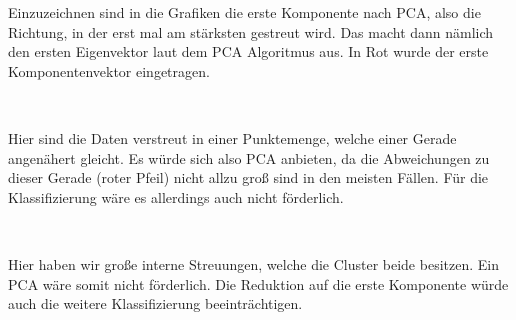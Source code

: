 \begin{aufgabe}
\end{aufgabe}

Einzuzeichnen sind in die Grafiken die erste Komponente nach PCA, also die Richtung, in der erst mal am stärksten gestreut wird. Das macht dann nämlich den ersten Eigenvektor laut dem PCA Algoritmus aus. In Rot wurde der erste Komponentenvektor eingetragen.

\begin{center}
	\\
\end{center}
Hier sind die Daten verstreut in einer Punktemenge, welche einer Gerade angenähert gleicht. Es würde sich also PCA anbieten, da die Abweichungen zu dieser Gerade (roter Pfeil) nicht allzu groß sind in den meisten Fällen. Für die Klassifizierung wäre es allerdings auch nicht förderlich.
\begin{center}
	\\
\end{center}
Hier haben wir große interne Streuungen, welche die Cluster beide besitzen. Ein PCA wäre somit nicht förderlich. Die Reduktion auf die erste Komponente würde auch die weitere Klassifizierung beeinträchtigen.
\begin{center}
	\\
\end{center}
